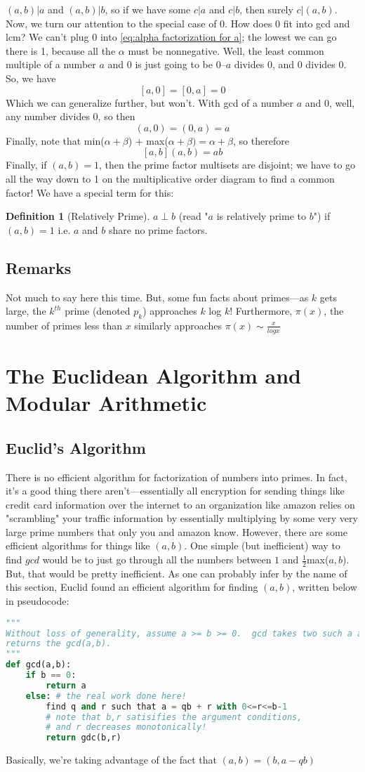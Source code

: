 \documentclass[10pt]{article}
\theoremstyle{definition}
\newtheorem{definition}{Definition}[section]
\begin{document}
$(a,b)|a$ and $(a,b)|b$, so if we have some $c|a$ and $c|b$, then surely $c|(a,b)$. Now, we turn our attention to the special case of $0$.  How does $0$ fit into gcd and lcm?  We can't plug $0$ into \ref{eq:alpha factorization for a}; the lowest we can go there is 1, because all the $\alpha$ must be nonnegative.  Well, the least common multiple of a number $a$ and 0 is just going to be 0--$a$ divides $0$, and $0$ divides 0.  So, we have 
\[[a,0] = [0,a] = 0\] Which we can generalize further, but won't.  With gcd of a number $a$ and 0, well, any number divides 0, so then 
\[(a,0) = (0,a) = a\]
Finally, note that min($\alpha + \beta$) $+$ max($\alpha + \beta) = \alpha + \beta$, so therefore 
\[[a,b](a,b) = ab\]
Finally, if $(a,b) = 1$, then the prime factor multisets are disjoint; we have to go all the way down to 1 on the multiplicative order diagram to find a common factor!  We have a special term for this: 
\begin{definition}[Relatively Prime]
$a\perp b$ (read "$a$ is relatively prime to $b$") if $(a,b)=1$ i.e. $a$ and $b$ share no prime factors.  
\end{definition}
\subsection{Remarks}
Not much to say here this time.  But, some fun facts about primes---as $k$ gets large, the $k^{th}$ prime (denoted $p_k$) approaches $k$ log $k$!  Furthermore, $\pi (x)$, the number of primes less than $x$ similarly approaches $\pi (x)\sim \frac{x}{log x}$
\newpage 
\section{The Euclidean Algorithm and Modular Arithmetic}
\subsection{Euclid's Algorithm}
There is no efficient algorithm for factorization of numbers into primes.  In fact, it's a good thing there aren't---essentially all encryption for sending things like credit card information over the internet to an organization like amazon relies on "scrambling" your traffic information by essentially multiplying by some very very large prime numbers that only you and amazon know.  However, there are some efficient algorithms for things like $(a,b)$.  One simple (but inefficient) way to find $gcd$ would be to just go through all the numbers between $1$ and $\frac{1}{2}$max($a,b$).  But, that would be pretty inefficient.  As one can probably infer by the name of this section, Euclid found an efficient algorithm for finding $(a,b)$, written below in pseudocode:
\begin{lstlisting}[language=Python]
""" 
Without loss of generality, assume a >= b >= 0.  gcd takes two such a and b, and 
returns the gcd(a,b). 
"""
def gcd(a,b): 
	if b == 0:
		return a
	else: # the real work done here!
		find q and r such that a = qb + r with 0<=r<=b-1 
		# note that b,r satisifies the argument conditions, 
		# and r decreases monotonically!
		return gdc(b,r)
\end{lstlisting}
Basically, we're taking advantage of the fact that $(a,b) = (b,a-qb)$
\end{document}
